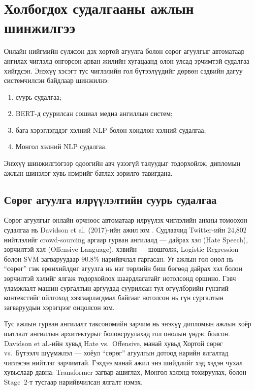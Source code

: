 \section{Холбогдох судалгааны ажлын шинжилгээ}
\label{sec:related-work}

Онлайн нийгмийн сүлжээн дэх хортой агуулга болон сөрөг агуулгыг
автоматаар ангилах чиглэлд өнгөрсөн арван жилийн хугацаанд олон улсад эрчимтэй
судалгаа хийгдсэн. Энэхүү хэсэгт тус чиглэлийн гол бүтээлүүдийг дөрвөн сэдвийн дагуу
системчилсэн байдлаар шинжилнэ:
\begin{enumerate}
  \item суурь судалгаа;
  \item BERT-д суурилсан сошиал медиа ангиллын систем;
  \item бага хэрэглэгддэг хэлний NLP болон хөндлөн хэлний судалгаа;
  \item Монгол хэлний NLP судалгаа.
\end{enumerate}
Энэхүү шинжилгээгээр одоогийн авч үзээгүй талуудыг тодорхойлж, дипломын ажлын шинэлэг
хувь нэмрийг батлах зорилго тавигдана.

\subsection{Сөрөг агуулга илрүүлэлтийн суурь судалгаа}

Сөрөг агуулгыг онлайн орчноос автоматаар илрүүлэх чиглэлийн анхны
томоохон судалгаа нь Davidson et al. (2017)-ийн ажил юм \cite{davidson2017}.
Судлаачид Twitter-ийн 24,802 нийтлэлийг crowd-sourcing аргаар гурван ангилалд
--- дайрах хэл (Hate Speech), зөрчилтэй хэл (Offensive Language), хэвийн ---
шошголж, Logistic Regression болон SVM загваруудаар $90.8\%$ нарийвчлал гаргасан.
Уг ажлын гол онол нь ``сөрөг'' гэж ерөнхийлдөг агуулга нь нэг төрлийн биш
бөгөөд дайрах хэл болон зөрчилтэй хэлийг ялгаж тодорхойлох шаардлагатайг нотолсонд оршино.
Гэвч уламжлалт машин сургалтын аргуудад суурилсан тул өгүүлбэрийн гүнзгий
контекстийг ойлгоход хязгаарлагдмал байгааг нотолсон нь гүн сургалтын
загваруудын хэрэгцээг онцолсон юм.

Тус ажлын гурван ангилалт таксономийн зарчим нь энэхүү дипломын ажлын хоёр
шатлалт ангиллын архитектурыг боловсруулахад гол онолын үндэс болсон.
Davidson et al.-ийн хувьд Hate vs.\ Offensive, манай хувьд Хортой сөрөг
vs.\ Бүтээлч шүүмжлэл --- хоёул ``сөрөг'' агуулгын дотоод нарийн ялгалтад
чиглэсэн нийтлэг зарчимтай. Гэхдээ манай ажил энэ шийдлийг хэд хэдэн чухал
хувьслаар давна: Transformer загвар ашиглах, Монгол хэлэнд тохируулах, болон
Stage~2-т тусгаар нарийвчилсан ялгалт нэмэх.

